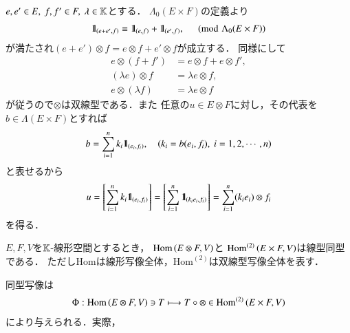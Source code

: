 	\begin{prf}
		$e,e' \in E,\ f,f' \in F,\ \lambda \in \mathbb{K}$とする．
		$\Lambda_0(E \times F)$の定義より
		\begin{align}
			\mbox{1}\hspace{-0.25em}\mbox{l}_{(e+e',f)} \equiv \mbox{1}\hspace{-0.25em}\mbox{l}_{(e,f)}+\mbox{1}\hspace{-0.25em}\mbox{l}_{(e',f)},
			\quad \pmod{\Lambda_0(E \times F)}
		\end{align}
		が満たされ$(e + e') \otimes f = e \otimes f + e' \otimes f$が成立する．
		同様にして
		\begin{align}
			e \otimes (f+f') &= e \otimes f + e \otimes f', \\
			(\lambda e) \otimes f &= \lambda e \otimes f, \\
			e \otimes (\lambda f) &= \lambda e \otimes f
		\end{align}
		が従うので$\otimes$は双線型である．また
		任意の$u \in E \otimes F$に対し，その代表を$b \in \Lambda(E \times F)$とすれば
		\begin{align}
			b = \sum_{i=1}^n k_i \mbox{1}\hspace{-0.25em}\mbox{l}_{(e_i,f_i)},
			\quad \left( k_i = b(e_i,f_i),\ i=1,2,\cdots,n \right)
		\end{align}
		と表せるから
		\begin{align}
			u = \left[ \sum_{i=1}^n k_i \mbox{1}\hspace{-0.25em}\mbox{l}_{(e_i,f_i)} \right]
			= \left[ \sum_{i=1}^n \mbox{1}\hspace{-0.25em}\mbox{l}_{(k_i e_i,f_i)} \right]
			= \sum_{i=1}^n (k_i e_i) \otimes f_i
		\end{align}
		を得る．
		\QED
	\end{prf}
	
	\begin{screen}
		\begin{thm}
			$E,F,V$を$\mathbb{K}$-線形空間とするとき，
			$\mathrm{Hom} \left(E \otimes F,V\right)$と
			$\mathrm{Hom}^{(2)} \left(E \times F,V\right)$は線型同型である．
			ただしHomは線形写像全体，$\mathrm{Hom}^{(2)}$は双線型写像全体を表す．
		\end{thm}
	\end{screen}
	
	\begin{prf}
		同型写像は
		\begin{align}
			\Phi: \mathrm{Hom} \left(E \otimes F,V\right) \ni T \longmapsto T \circ \otimes \in \mathrm{Hom}^{(2)} \left(E \times F,V\right)
		\end{align}
		により与えられる．実際，
	\end{prf}